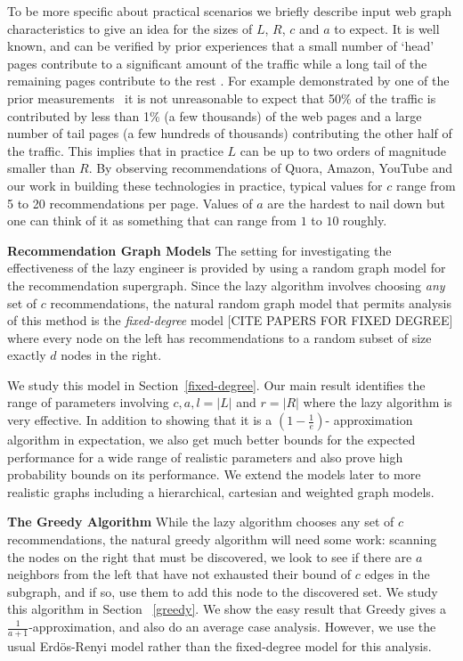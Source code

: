 To be more specific about practical scenarios we briefly describe
input web graph characteristics to give an idea for the sizes of $L$,
$R$, $c$ and $a$ to expect. It is well known, and can be verified by
prior experiences that a small number of `head' pages contribute to a
significant amount of the traffic while a long tail of the remaining
pages contribute to the rest \cite{HubermanAdamic1999, DuDemmerBrewer2006}. For example
demonstrated by one of the prior measurements~\cite{KumarNorrisSun2009}
it is not unreasonable to expect that 50\% of the traffic is
contributed by less than 1\% (a few thousands) of the web pages and a
large number of tail pages (a few hundreds of thousands) contributing
the other half of the traffic. This implies that in practice $L$ can
be up to two orders of magnitude smaller than $R$.  By observing
recommendations of Quora, Amazon, YouTube and our work in building
these technologies in practice, typical values for $c$ range from 5 to
20 recommendations per page. Values of $a$ are the hardest to nail
down but one can think of it as something that can range from $1$ to
$10$ roughly.

{\bf Recommendation Graph Models} The setting for investigating the
effectiveness of the lazy engineer is provided by using a random graph
model for the recommendation supergraph. Since the lazy algorithm
involves choosing {\em any} set of $c$ recommendations, the natural
random graph model that permits analysis of this method is the {\em
  fixed-degree} model [CITE PAPERS FOR FIXED DEGREE] where every node
on the left has recommendations to a random subset of size exactly $d$
nodes in the right.

We study this model in Section~\ref{fixed-degree}. Our main result
identifies the range of parameters involving $c,a,l=|L|$ and $r =|R|$
where the lazy algorithm is very effective. In addition to showing
that it is a $(1-\frac1e)$- approximation algorithm in expectation, we
also get much better bounds for the expected performance for a wide
range of realistic parameters and also prove high probability bounds
on its performance. We extend the models later to more realistic
graphs including a hierarchical, cartesian and weighted graph
models. \vs

{\bf The Greedy Algorithm}
While the lazy algorithm chooses any set of $c$ recommendations, the natural
greedy algorithm will need some work: scanning the nodes on the right that must
be discovered, we look to see if there are $a$ neighbors from the left that have
not exhausted their bound of $c$ edges in the subgraph, and if so, use them to
add this node to the discovered set. We study this algorithm in Section
~\ref{greedy}. We show the easy result that Greedy gives a 
$\frac{1}{a+1}$-approximation, and also do an average case analysis. However, we
use the usual Erd\"os-Renyi model \cite{ErdosRenyi59}
rather than the fixed-degree model for this analysis.

